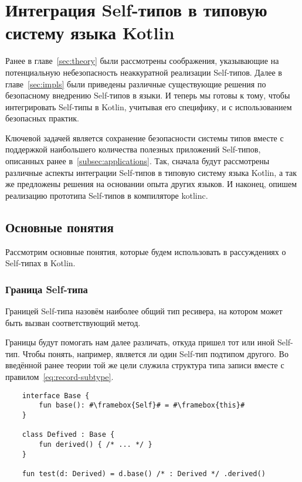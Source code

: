 \section{Интеграция Self-типов в типовую систему языка Kotlin} \label{sec:integration}

Ранее в главе~\ref{sec:theory} были рассмотрены соображения, указывающие на потенциальную небезопасность неаккуратной реализации Self-типов.
Далее в главе~\ref{sec:impls} были приведены различные существующие решения по безопасному внедрению Self-типов в языки.
И теперь мы готовы к тому, чтобы интегрировать Self-типы в Kotlin, учитывая его специфику, и с использованием безопасных практик.

Ключевой задачей является сохранение безопасности системы типов вместе с поддержкой наибольшего количества полезных приложений Self-типов, описанных ранее в~\ref{subsec:applications}.
Так, сначала будут рассмотрены различные аспекты интеграции Self-типов в типовую систему языка Kotlin, а так же предложены решения на основании опыта других языков.
И наконец, опишем реализацию прототипа Self-типов в компиляторе kotlinc.


\subsection{Основные понятия}

Рассмотрим основные понятия, которые будем использовать в рассуждениях о Self-типах в Kotlin.

\subsubsection{Граница Self-типа}

\begin{definition}
    \label{def:bound}
    Границей Self-типа назовём наиболее общий тип ресивера, на котором может быть вызван соответствующий метод.
\end{definition}

Границы будут помогать нам далее различать, откуда пришел тот или иной Self-тип.
Чтобы понять, например, является ли один Self-тип подтипом другого.
Во введённой ранее теории той же цели служила структура типа записи вместе с правилом~\eqref{eq:record-subtype}.

\begin{verbatim}
    interface Base {
        fun base(): #\framebox{Self}# = #\framebox{this}#
    }

    class Defived : Base {
        fun derived() { /* ... */ }
    }

    fun test(d: Derived) = d.base() /* : Derived */ .derived()
\end{verbatim}

